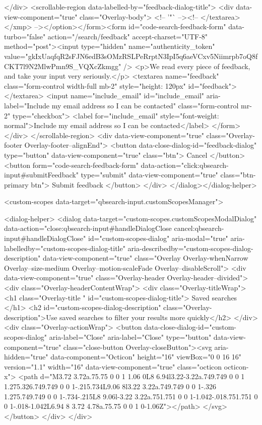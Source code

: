 </div>
      <scrollable-region data-labelled-by="feedback-dialog-title">
        <div data-view-component="true" class="Overlay-body">        <!-- '"` --><!-- </textarea></xmp> --></option></form><form id="code-search-feedback-form" data-turbo="false" action="/search/feedback" accept-charset="UTF-8" method="post"><input type="hidden" name="authenticity_token" value="gkIxUaqfqR2sFJN6edB3sOMzRSLPeRrptN3IpI5q6aeVCxv5Niimrpb7oQ8fCKT7l9N2MlwPmn9S_VQXcZkmgg" />
          <p>We read every piece of feedback, and take your input very seriously.</p>
          <textarea name="feedback" class="form-control width-full mb-2" style="height: 120px" id="feedback"></textarea>
          <input name="include_email" id="include_email" aria-label="Include my email address so I can be contacted" class="form-control mr-2" type="checkbox">
          <label for="include_email" style="font-weight: normal">Include my email address so I can be contacted</label>
</form></div>
      </scrollable-region>
      <div data-view-component="true" class="Overlay-footer Overlay-footer--alignEnd">          <button data-close-dialog-id="feedback-dialog" type="button" data-view-component="true" class="btn">    Cancel
</button>
          <button form="code-search-feedback-form" data-action="click:qbsearch-input#submitFeedback" type="submit" data-view-component="true" class="btn-primary btn">    Submit feedback
</button>
</div>
</dialog></dialog-helper>

    <custom-scopes data-target="qbsearch-input.customScopesManager">
    
<dialog-helper>
  <dialog data-target="custom-scopes.customScopesModalDialog" data-action="close:qbsearch-input#handleDialogClose cancel:qbsearch-input#handleDialogClose" id="custom-scopes-dialog" aria-modal="true" aria-labelledby="custom-scopes-dialog-title" aria-describedby="custom-scopes-dialog-description" data-view-component="true" class="Overlay Overlay-whenNarrow Overlay--size-medium Overlay--motion-scaleFade Overlay--disableScroll">
    <div data-view-component="true" class="Overlay-header Overlay-header--divided">
  <div class="Overlay-headerContentWrap">
    <div class="Overlay-titleWrap">
      <h1 class="Overlay-title " id="custom-scopes-dialog-title">
        Saved searches
      </h1>
        <h2 id="custom-scopes-dialog-description" class="Overlay-description">Use saved searches to filter your results more quickly</h2>
    </div>
    <div class="Overlay-actionWrap">
      <button data-close-dialog-id="custom-scopes-dialog" aria-label="Close" aria-label="Close" type="button" data-view-component="true" class="close-button Overlay-closeButton"><svg aria-hidden="true" data-component="Octicon" height="16" viewBox="0 0 16 16" version="1.1" width="16" data-view-component="true" class="octicon octicon-x">
    <path d="M3.72 3.72a.75.75 0 0 1 1.06 0L8 6.94l3.22-3.22a.749.749 0 0 1 1.275.326.749.749 0 0 1-.215.734L9.06 8l3.22 3.22a.749.749 0 0 1-.326 1.275.749.749 0 0 1-.734-.215L8 9.06l-3.22 3.22a.751.751 0 0 1-1.042-.018.751.751 0 0 1-.018-1.042L6.94 8 3.72 4.78a.75.75 0 0 1 0-1.06Z"></path>
</svg></button>
    </div>
  </div>
  
